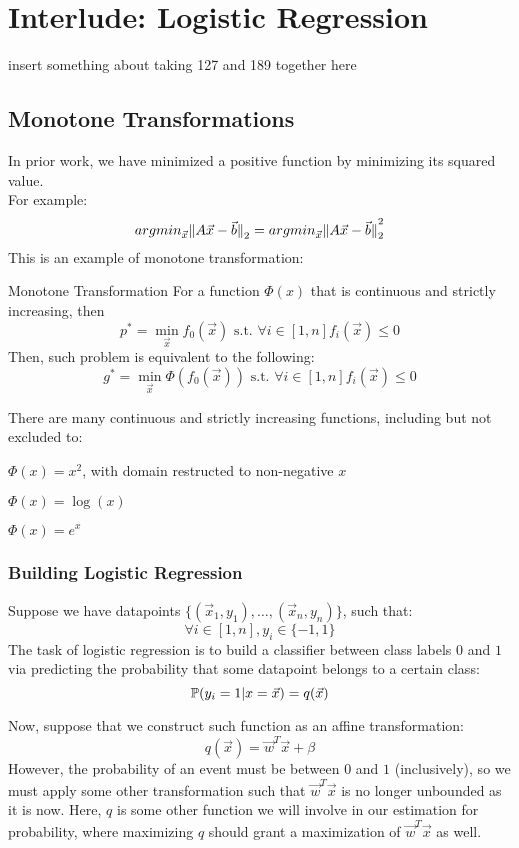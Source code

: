 \chapter{Interlude: Logistic Regression}
insert something about taking 127 and 189 together here

\section{Monotone Transformations}
In prior work, we have minimized a positive function by minimizing its squared value. \\
For example:
\[
    {argmin}_{\vec{x}} \pnorm{A\vec{x} - \vec{b}}{2}
    = {argmin}_{\vec{x}} \pnorm[2]{A\vec{x} - \vec{b}}{2}
\]
This is an example of monotone transformation:
\begin{ln-define}{Monotone Transformation}{}
    For a function $\Phi(x)$ that is continuous and strictly increasing, then
    \[
        p^* = \min_{\vec{x}} f_0 (\vec{x}) \text{ s.t. } \forall i \in [1, n] f_i(\vec{x}) \leq 0
    \]
    Then, such problem is equivalent to the following:
    \[
        g^* = \min_{\vec{x}} \Phi(f_0 (\vec{x})) \text{ s.t. } \forall i \in [1, n] f_i(\vec{x}) \leq 0
    \]
\end{ln-define}
There are many continuous and strictly increasing functions, including but not excluded to:
\begin{bindenum}
    \item $\Phi(x) = x^2$, with domain restructed to non-negative $x$
    \item $\Phi(x) = \log (x)$
    \item $\Phi(x) = e^x$
\end{bindenum}

\subsection{Building Logistic Regression}
Suppose we have datapoints $\{(\vec{x}_1, y_1), \dots, (\vec{x}_n, y_n)\}$, such that:
\[
    \forall i \in [1, n], y_i \in \{-1, 1\}
\]
The task of logistic regression is to build a classifier between class labels $0$ and $1$ via predicting the probability that some datapoint belongs to a certain class:
\[
    \P(y_i = 1 | x = \vec{x}) = q(\vec{x})
\]

Now, suppose that we construct such function as an affine transformation:
\[
    q(\vec{x}) = \vec{w}^T \vec{x} + \beta
\]
However, the probability of an event must be between $0$ and $1$ (inclusively), so we must apply some other transformation such that $\vec{w}^T \vec{x}$ is no longer unbounded as it is now.
Here, $q$ is some other function we will involve in our estimation for probability, where maximizing $q$ should grant a maximization of $\vec{w}^T\vec{x}$ as well.

